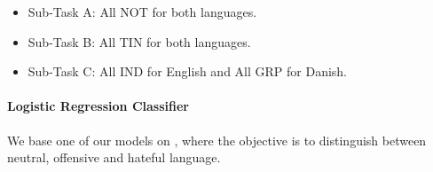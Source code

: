 \documentclass{article}
\begin{document}
\iffalse

\begin{equation}\label{eq:linregr}
    y = \beta0 + \beta_1X_1 + \beta_2X_2 + \dots + \beta_n X_n
\end{equation}

\begin{equation}\label{eq:sigmoid}
    p = \frac{1}{1+e^{-y}}
\end{equation}

\begin{equation}\label{eq:logregr}
    p = \frac{1}{1 + e^{-(\beta0 + \beta_1X_1 + \beta_2X_2 + \dots + \beta_n X_n)}}
\end{equation}
\fi

\iffalse
\paragraph{RNNs}
Our neural network models use \textit{Recurrent Neural Networks (RNNs)} \cite{elman1990finding} as a key element in their architecture. RNNs compute a fixed size vector representation of a sequence, by reading in $n$ vectors $x_1, \dots x_n$, and producing an output vector $h_n$ that depends on the entire sequence \cite{plank2016multilingual}. 

\paragraph{Bi-directional RNNs} (BiRNNs) are another extension of RNNs, where each input sequence is read twice, from left to right and right to left \cite{plank2016multilingual}. This bi-directional approach is based on the idea that the elements in a sequence are based on both the previous and future elements. Our models use \textit{Bi-directional LSTMs (BiLSTMs}), where the output vectors from the forward and backward pass are concatenated. 
\fi

\begin{itemize}
 \setlength\itemsep{-1mm}
 \item Sub-Task A: All NOT for both languages.
    \item Sub-Task B: All TIN for both languages.
    \item Sub-Task C: All IND for English and All GRP for Danish. 
\end{itemize}

\paragraph{Logistic Regression Classifier}\label{lrClassifier}
We base one of our models on \cite{davidson2017automated}, where the objective is to distinguish between neutral, offensive and hateful language. 
\end{document}
